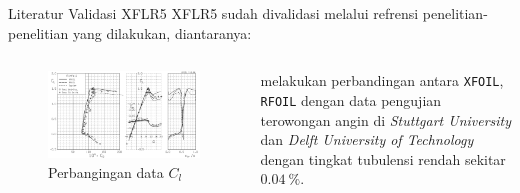 \begin{frame}{Literatur Validasi XFLR5}
  XFLR5 sudah divalidasi melalui refrensi penelitian-penelitian yang dilakukan, diantaranya:
  \pause

  \begin{columns}[t]
    \begin{column}{.5\linewidth}
      \begin{figure}[h]
        \centering
        \includegraphics[width=0.8\linewidth]{statics/compar_airfoil1}
        \caption{Perbangingan data $C_l$}
        \label{fig:comparairfoil1}
      \end{figure}
    \end{column}

    \begin{column}{.5\linewidth}
      \begin{block}{}
        \cite{lasauskas2009analysis} melakukan perbandingan antara \texttt{XFOIL}, \texttt{RFOIL} dengan data pengujian terowongan angin di \textit{Stuttgart University} dan \textit{Delft University of Technology} dengan tingkat tubulensi rendah sekitar $0.04\:\%$.
      \end{block}
    \end{column}
  \end{columns}
\end{frame}

